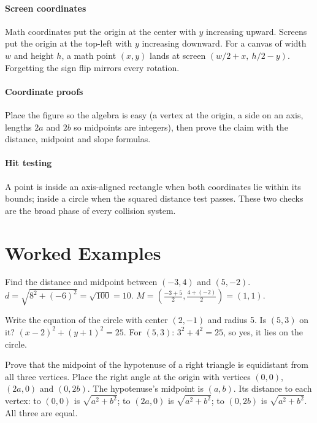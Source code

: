 \paragraph{Screen coordinates} Math coordinates put the origin at the center with $y$ increasing upward. Screens put the origin at the top-left with $y$ increasing downward. For a canvas of width $w$ and height $h$, a math point $(x, y)$ lands at screen $(w/2 + x,\ h/2 - y)$. Forgetting the sign flip mirrors every rotation.

\paragraph{Coordinate proofs} Place the figure so the algebra is easy (a vertex at the origin, a side on an axis, lengths $2a$ and $2b$ so midpoints are integers), then prove the claim with the distance, midpoint and slope formulas.

\paragraph{Hit testing} A point is inside an axis-aligned rectangle when both coordinates lie within its bounds; inside a circle when the squared distance test passes. These two checks are the broad phase of every collision system.

\section{Worked Examples}

\begin{example}
Find the distance and midpoint between $(-3, 4)$ and $(5, -2)$.
\solution $d = \sqrt{8^2 + (-6)^2} = \sqrt{100} = 10$. $M = \left(\frac{-3 + 5}{2}, \frac{4 + (-2)}{2}\right) = (1, 1)$.
\end{example}

\begin{example}
Write the equation of the circle with center $(2, -1)$ and radius 5. Is $(5, 3)$ on it?
\solution $(x - 2)^2 + (y + 1)^2 = 25$. For $(5, 3)$: $3^2 + 4^2 = 25$, so yes, it lies on the circle.
\end{example}

\begin{example}
Prove that the midpoint of the hypotenuse of a right triangle is equidistant from all three vertices.
\solution Place the right angle at the origin with vertices $(0, 0)$, $(2a, 0)$ and $(0, 2b)$. The hypotenuse's midpoint is $(a, b)$. Its distance to each vertex: to $(0, 0)$ is $\sqrt{a^2 + b^2}$; to $(2a, 0)$ is $\sqrt{a^2 + b^2}$; to $(0, 2b)$ is $\sqrt{a^2 + b^2}$. All three are equal.
\end{example}

